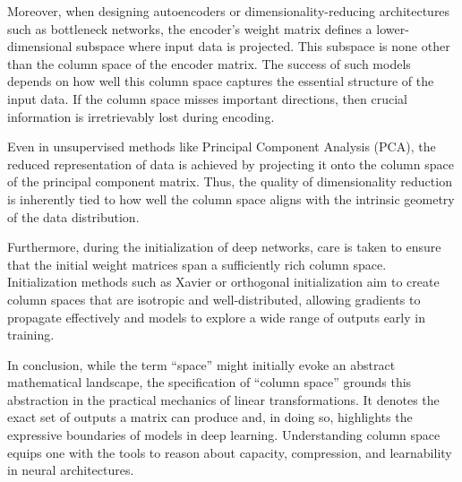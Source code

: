 Moreover, when designing autoencoders or dimensionality-reducing architectures such as bottleneck networks, the encoder's weight matrix defines a lower-dimensional subspace where input data is projected. This subspace is none other than the column space of the encoder matrix. The success of such models depends on how well this column space captures the essential structure of the input data. If the column space misses important directions, then crucial information is irretrievably lost during encoding.

Even in unsupervised methods like Principal Component Analysis (PCA), the reduced representation of data is achieved by projecting it onto the column space of the principal component matrix. Thus, the quality of dimensionality reduction is inherently tied to how well the column space aligns with the intrinsic geometry of the data distribution.

Furthermore, during the initialization of deep networks, care is taken to ensure that the initial weight matrices span a sufficiently rich column space. Initialization methods such as Xavier or orthogonal initialization aim to create column spaces that are isotropic and well-distributed, allowing gradients to propagate effectively and models to explore a wide range of outputs early in training.

In conclusion, while the term ``space'' might initially evoke an abstract mathematical landscape, the specification of ``column space'' grounds this abstraction in the practical mechanics of linear transformations. It denotes the exact set of outputs a matrix can produce and, in doing so, highlights the expressive boundaries of models in deep learning. Understanding column space equips one with the tools to reason about capacity, compression, and learnability in neural architectures.